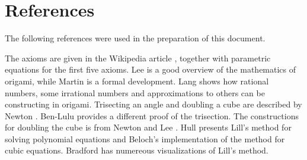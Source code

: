
\chapter*{References}\label{c.ref}

The following references were used in the preparation of this document.

The axioms are given in the Wikipedia article \cite{hh}, together with parametric equations for the first five axioms. Lee \cite[Chapter~4]{hwa} is a good overview of the mathematics of origami, while Martin \cite[Chapter~10]{martin} is a formal development. Lang \cite{lang} shows how rational numbers, some irrational numbers and approximations to others can be constructing in origami. Trisecting an angle and doubling a cube are described by Newton \cite{newton}. Ben-Lulu \cite{oriah} provides a different proof of the trisection. The constructions for doubling the cube is from Newton \cite{newton} and Lee \cite{hwa}. Hull \cite{hull-beloch} presents Lill's method for solving polynomial equations and Beloch's implementation of the method for cubic equations. Bradford \cite{bradford} has numereous visualizations of Lill's method.

\begingroup
\renewcommand\bibname{}
\let\clearpage\relax
\vspace{-4ex}


\endgroup